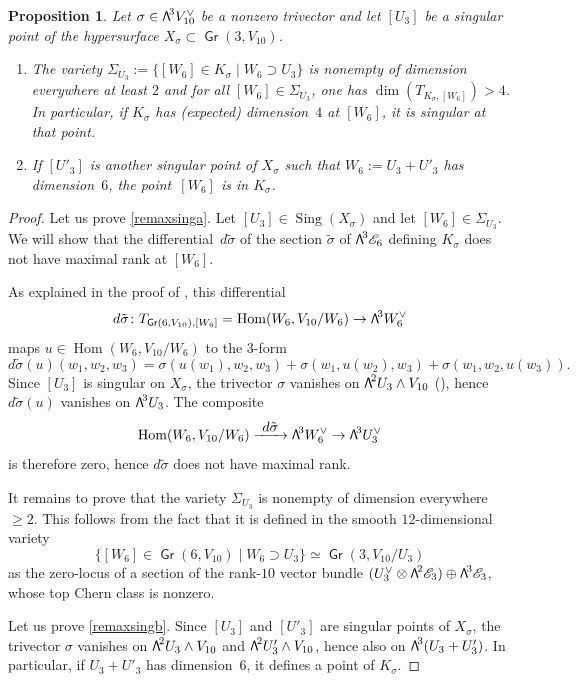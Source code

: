 \documentclass[11pt]{article}
\let\mathcal\mathscr
\newenvironment{enumeratea}
{\bgroup\def\theenumi{\alph{enumi}}\def\theenumii{\arabic{enumii}}\begin{enumerate}}
{\end{enumerate}\egroup}
\newcommand\To[1]{\mathchoice{\xrightarrow{\textstyle\kern4pt#1\kern3pt}}{\stackrel{#1}{\longrightarrow}}{}{}}
\newtheorem{prop}[lemm]{Proposition}
\theoremstyle{definition}
\newcommand\cE{\mathcal{E}}
\DeclareMathOperator{\Gr}{\mathsf{Gr}}
\let\isom\simeq
\DeclareMathOperator{\Hom}{Hom}
\DeclareMathOperator{\Sing}{Sing}\let\sing\Sing
\newcommand\bw[1]{{\hbox{\large$\mathsf{\Lambda}$}^{\!#1}}}
\begin{document}
\begin{prop} \label{remaxsing}
Let $\sigma\in \bw3V_{10}^\vee$ be a nonzero trivector and let $[U_3]$ be a singular point of the hypersurface $X_\sigma\subset \Gr(3,V_{10})$.
\begin{enumeratea}
\item\label{remaxsinga}
The variety $\Sigma_{U_3}:=\{[W_6]\in K_\sigma\mid W_6 \supset U_3\}$ is nonempty of dimension everywhere at least $ 2$ and for all $[W_6]\in \Sigma_{U_3}$, one has $\dim(T_{K_\sigma, [W_6]})>4$. In particular, if $K_\sigma$ has (expected) dimension~$4$ at $ [W_6]$, it is singular at that point.

\item\label{remaxsingb}
If $[U'_3]$ is another singular point of $X_\sigma$ such that $W_6:=U_3+U'_3$ has dimension~$6$, the point~$ [W_6]$ is in $K_\sigma$.
\end{enumeratea}
\end{prop}

\begin{proof}
Let us prove \eqref{remaxsinga}. Let $[U_3]\in\Sing(X_\sigma)$ and let $[W_6]\in\Sigma_{U_3}$.
We will show that the differential~$d\tilde{\sigma}$ of the section $\tilde{\sigma}$ of $\bw3\cE_6$ defining
$K_\sigma$ does not have maximal rank at $[W_6]$.

As explained in the proof of \cite[Prop.\,3.1]{devo}, this differential
\[
d\tilde{\sigma}\colon T_{\Gr(6,V_{10}),[W_6]}=\Hom(W_6,V_{10}/W_6)\to \bw3W_6^\vee
\]
maps $u\in \Hom(W_6,V_{10}/W_6)$ to the 3-form
\[
d\tilde{\sigma}(u)( w_1, w_2, w_3 )= \sigma(u(w_1), w_2, w_3)+\sigma(w_1, u(w_2), w_3)+ \sigma(w_1, w_2, u(w_3)).
\]
Since $[U_3]$ is singular on $X_\sigma$, the trivector $\sigma$ vanishes on $\bw2U_3\wedge V_{10}$ (\cite[Prop.\,3.1]{devo}), hence~$d\tilde{\sigma}(u)$ vanishes on $\bw3U_3$. The composite
\begin{equation}
\label{eqdiff}
\Hom(W_6,V_{10}/W_6)\To{d\tilde{\sigma}} \bw3W_6^\vee
\to \bw3U_3^\vee
\end{equation}
is therefore zero, hence $d\tilde{\sigma}$ does not have maximal rank.

It remains to prove that the variety $\Sigma_{U_3} $ is nonempty of dimension everywhere $\ge 2$. This follows from the fact that it is defined in the smooth $12$-dimensional variety \[
 \{[W_6]\in \Gr(6,V_{10})\mid W_6 \supset U_3\}\isom \Gr(3, V_{10}/U_3)
\] as the zero-locus of a section of the
rank-$10$ vector bundle $(U_3^\vee\otimes \bw2\cE_3)\oplus \bw3\cE_3$, whose top Chern class is nonzero.

Let us prove \eqref{remaxsingb}. Since $[U_3]$ and $[U'_3]$ are singular points of $X_\sigma$, the trivector $\sigma$ vanishes on $\bw2U_3\wedge V_{10}$ and
$\bw2U'_3\wedge V_{10}$, hence also on $\bw3(U_3+U'_3)$. In particular, if $U_3+U'_3$ has dimension~$6$, it defines a point of $K_\sigma$.
\end{proof}
\end{document}
